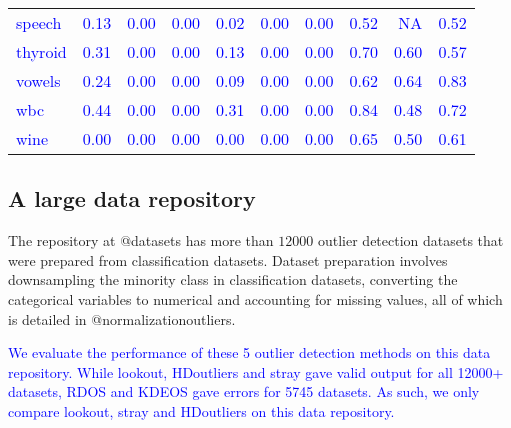 \documentclass[
]{article}
\begin{document}
\begin{table}
\begin{tabular}[t]{lrrrrrrrrr}
\textcolor{blue}{speech} & \textcolor{blue}{0.13} & \textcolor{blue}{0.00} & \textcolor{blue}{0.00} & \textcolor{blue}{0.02} & \textcolor{blue}{0.00} & \textcolor{blue}{0.00} & \textcolor{blue}{0.52} & \textcolor{blue}{NA} & \textcolor{blue}{0.52}\\
\textcolor{blue}{thyroid} & \textcolor{blue}{0.31} & \textcolor{blue}{0.00} & \textcolor{blue}{0.00} & \textcolor{blue}{0.13} & \textcolor{blue}{0.00} & \textcolor{blue}{0.00} & \textcolor{blue}{0.70} & \textcolor{blue}{0.60} & \textcolor{blue}{0.57}\\
\textcolor{blue}{vowels} & \textcolor{blue}{0.24} & \textcolor{blue}{0.00} & \textcolor{blue}{0.00} & \textcolor{blue}{0.09} & \textcolor{blue}{0.00} & \textcolor{blue}{0.00} & \textcolor{blue}{0.62} & \textcolor{blue}{0.64} & \textcolor{blue}{0.83}\\
\addlinespace
\textcolor{blue}{wbc} & \textcolor{blue}{0.44} & \textcolor{blue}{0.00} & \textcolor{blue}{0.00} & \textcolor{blue}{0.31} & \textcolor{blue}{0.00} & \textcolor{blue}{0.00} & \textcolor{blue}{0.84} & \textcolor{blue}{0.48} & \textcolor{blue}{0.72}\\
\textcolor{blue}{wine} & \textcolor{blue}{0.00} & \textcolor{blue}{0.00} & \textcolor{blue}{0.00} & \textcolor{blue}{0.00} & \textcolor{blue}{0.00} & \textcolor{blue}{0.00} & \textcolor{blue}{0.65} & \textcolor{blue}{0.50} & \textcolor{blue}{0.61}\\
\bottomrule
\end{tabular}
\end{table}

\hypertarget{a-large-data-repository}{%
\subsection{A large data repository}\label{a-large-data-repository}}

The repository at @datasets has more than \(12000\) outlier detection
datasets that were prepared from classification datasets. Dataset
preparation involves downsampling the minority class in classification
datasets, converting the categorical variables to numerical and
accounting for missing values, all of which is detailed in
@normalizationoutliers.

\textcolor{blue}{ We evaluate the performance of these 5 outlier detection methods on this data repository. While lookout, HDoutliers and stray gave valid output for all 12000+ datasets, RDOS and KDEOS gave errors for 5745 datasets. As such, we only compare lookout, stray and HDoutliers on this data repository.}
\end{document}
